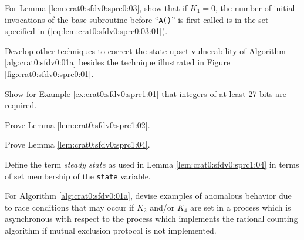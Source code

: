 \begin{vworkexercisestatement}
\label{exe:crat0:sexe0:07}
For Lemma \ref{lem:crat0:sfdv0:sprc0:03},
show that if $K_1=0$, the number of initial invocations
of the base subroutine before ``\texttt{A()}'' is first
called is in the set specified in
(\ref{eq:lem:crat0:sfdv0:sprc0:03:01}).
\end{vworkexercisestatement}
\vworkexercisefooter{}

\begin{vworkexercisestatement}
\label{exe:crat0:sexe0:08}
Develop other techniques to correct the state upset vulnerability
of Algorithm \ref{alg:crat0:sfdv0:01a} besides
the technique illustrated in 
Figure \ref{fig:crat0:sfdv0:sprc0:01}.
\end{vworkexercisestatement}
\vworkexercisefooter{}

\begin{vworkexercisestatement}
\label{exe:crat0:sexe0:09}
Show for Example \ref{ex:crat0:sfdv0:sprc1:01} that integers of at least
27 bits are required.
\end{vworkexercisestatement}
\vworkexercisefooter{}

\begin{vworkexercisestatement}
\label{exe:crat0:sexe0:10}
Prove Lemma \ref{lem:crat0:sfdv0:sprc1:02}.
\end{vworkexercisestatement}
\vworkexercisefooter{}

\begin{vworkexercisestatement}
\label{exe:crat0:sexe0:12}
Prove Lemma \ref{lem:crat0:sfdv0:sprc1:04}.
\end{vworkexercisestatement}
\vworkexercisefooter{}

\begin{vworkexercisestatement}
\label{exe:crat0:sexe0:13}
Define the term \emph{steady state} as used in
Lemma \ref{lem:crat0:sfdv0:sprc1:04} in terms of
set membership of the \texttt{state} variable.
\end{vworkexercisestatement}
\vworkexercisefooter{}

\begin{vworkexercisestatement}
\label{exe:crat0:sexe0:14}
For Algorithm \ref{alg:crat0:sfdv0:01a}, devise examples of anomalous behavior due to
race conditions that may occur if $K_2$ and/or $K_4$ are set in a process
which is asynchronous with respect to the process which implements the
rational counting algorithm if mutual exclusion protocol is not 
implemented.
\end{vworkexercisestatement}
\vworkexercisefooter{}

